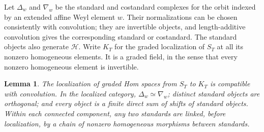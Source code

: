\documentclass[11pt]{article}
\numberwithin{equation}{section}
\newtheorem{lemma}[theorem]{Lemma}
\theoremstyle{definition}
\theoremstyle{remark}
\begin{document}
Let $\Delta_w$ and $\nabla_w$ be the standard and costandard
complexes for the orbit indexed by an extended affine Weyl element
$w$.  Their normalizations can be chosen consistently with
convolution; they are invertible objects, and length-additive
convolution gives the corresponding standard or costandard.
The standard objects also generate $\mathscr H$.
Write $K_T$ for the graded localization of $S_T$ at all its nonzero
homogeneous elements.  It is a graded field, in the sense that every
nonzero homogeneous element is invertible.

\begin{lemma}\label{enh:localized-standards}
The localization of graded Hom spaces from $S_T$ to $K_T$ is
compatible with convolution.  In the localized category,
$\Delta_w\simeq\nabla_w$; distinct standard objects are orthogonal;
and every object is a finite direct sum of shifts of standard
objects.  Within each connected component, any two standards are
linked, before localization, by a chain of nonzero homogeneous
morphisms between standards.
\end{lemma}
\end{document}

